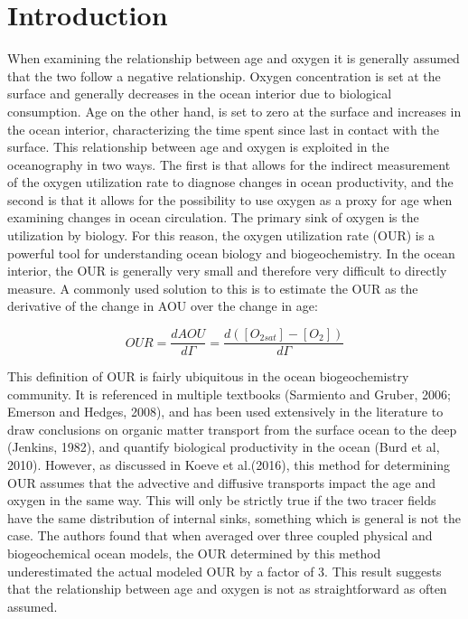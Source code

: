 \section{Introduction}
When examining the relationship between age and oxygen it is generally assumed that the two follow a negative relationship. Oxygen concentration is set at the surface and generally decreases in the ocean interior due to biological consumption. Age on the other hand, is set to zero at the surface and increases in the ocean interior, characterizing the time spent since last in contact with the surface. This relationship between age and oxygen is exploited in the oceanography in two ways. The first is that allows for the indirect measurement of the oxygen utilization rate to diagnose changes in ocean productivity, and the second is that it allows for the possibility to use oxygen as a proxy for age when examining changes in ocean circulation.
The primary sink of oxygen is the utilization by biology. For this reason, the oxygen utilization rate (OUR) is a powerful tool for understanding ocean biology and biogeochemistry. In the ocean interior, the OUR is generally very small and therefore very difficult to directly measure. A commonly used solution to this is to estimate the OUR as the derivative of the change in AOU over the change in age:

\begin{equation}
  OUR = \frac{dAOU}{d\Gamma} = \frac{d([O_{2 sat}] - [O_2])}{d\Gamma}
\end{equation}

This definition of OUR is fairly ubiquitous in the ocean biogeochemistry community. It is referenced in multiple textbooks (Sarmiento and Gruber, 2006; Emerson and Hedges, 2008), and has been used extensively in the literature to draw conclusions on organic matter transport from the surface ocean to the deep (Jenkins, 1982), and quantify biological productivity in the ocean (Burd et al, 2010). However, as discussed in Koeve et al.(2016), this method for determining OUR assumes that the advective and diffusive transports impact the age and oxygen in the same way. This will only be strictly true if the two tracer fields have the same distribution of internal sinks, something which is general is not the case. The authors found that when averaged over three coupled physical and biogeochemical ocean models, the OUR determined by this method underestimated the actual modeled OUR by a factor of 3. This result suggests that the relationship between age and oxygen is not as straightforward as often assumed.

